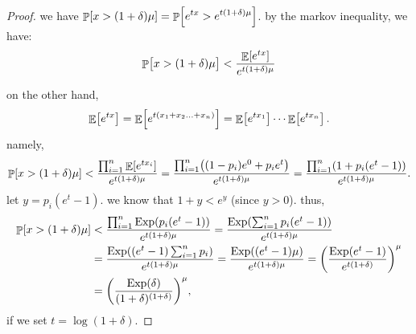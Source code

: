 \begin{proof}
    we have $\displaystyle \Prob{ x > (1+\delta)\mu } = \Prob{ e^{t x}
       > e^{t(1+\delta)\mu}}$.  by the markov inequality, we have:
    \begin{align*}
        \Prob{\big. x > (1+\delta)\mu } < \frac{ \Ex{e^{t
                 x}}}{e^{t(1+\delta)\mu}}
    \end{align*}
    
    on the other hand,
    \begin{align*}
        \mathop{\mathbb{E}}\!\left[ {e^{t x} } \right] = \mathop{\mathbb{E}}\!\left[ { e^{t(x_1 + x_2 \ldots + x_n)} } \right] =
        \mathop{\mathbb{E}}\!\left[ {e^{t x_1}} \right] \cdots \mathop{\mathbb{E}}\!\left[ {e^{t x_n}} \right].
    \end{align*}
    namely,
    \begin{align*}
        \Prob{ x > (1+\delta)\mu } < \frac{\prod_{i=1}^n \Ex{e^{t
                 x_i}}}{e^{t(1+\delta)\mu}} = \frac{\prod_{i=1}^n
           \pth{ (1-p_i)e^0 + p_i e^{t }}} {e^{t(1+\delta)\mu}} =
        \frac{\prod_{i=1}^n \pth{ 1+ p_i(e^{t} -1 ) }}
        {e^{t(1+\delta)\mu}}.
    \end{align*}
    let $y = p_i (e^{t} - 1 )$. we know that $1+y < e^y$ (since $y >
    0$). thus,
    \begin{align*}
        \Prob{ x > (1+\delta)\mu }%
        &<%
        \frac{\prod_{i=1}^n { \Exp( p_i(e^{t} -1 )) }}
        {e^{t(1+\delta)\mu}}%
        =%
        \frac{\Exp \pth{ \sum_{i=1}^n p_i(e^{t} -1 ) }}
        {e^{t(1+\delta)\mu}}%
        \\&%
        =%
        \frac{\Exp \pth{ (e^{t} -1 )\sum_{i=1}^n p_i }}
        {e^{t(1+\delta)\mu}} = \frac{\Exp \pth{ (e^{t} -1 )\mu }}
        {e^{t(1+\delta)\mu}} = \pth{\frac{\Exp \pth{ e^{t} -1 }}
           {e^{t(1+\delta)}}}^\mu%
        \\&%
        =%
        \pth{\frac{\Exp \pth{ \delta }}
           {(1+\delta)^{(1+\delta)}}}^\mu,
    \end{align*}
    if we set $t = \log ( 1+\delta)$.    
\end{proof}


